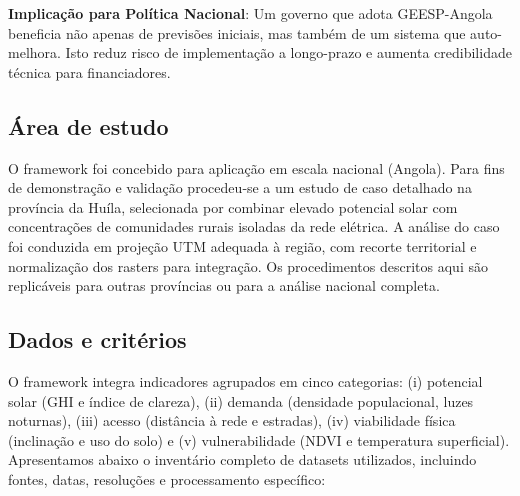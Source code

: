 \documentclass[12pt, a4paper]{article}
\begin{document}
{{{{{{{{{{{{\textbf{Implicação para Política Nacional}: Um governo que adota GEESP-Angola beneficia não apenas de previsões iniciais, mas também de um sistema que auto-melhora. Isto reduz risco de implementação a longo-prazo e aumenta credibilidade técnica para financiadores.

\subsection{Área de estudo}

O framework foi concebido para aplicação em escala nacional (Angola). Para fins de demonstração e validação procedeu‑se a um estudo de caso detalhado na província da Huíla, selecionada por combinar elevado potencial solar com concentrações de comunidades rurais isoladas da rede elétrica. A análise do caso foi conduzida em projeção UTM adequada à região, com recorte territorial e normalização dos rasters para integração. Os procedimentos descritos aqui são replicáveis para outras províncias ou para a análise nacional completa.

\subsection{Dados e critérios}

O framework integra indicadores agrupados em cinco categorias: (i) potencial solar (GHI e índice de clareza), (ii) demanda (densidade populacional, luzes noturnas), (iii) acesso (distância à rede e estradas), (iv) viabilidade física (inclinação e uso do solo) e (v) vulnerabilidade (NDVI e temperatura superficial). Apresentamos abaixo o inventário completo de datasets utilizados, incluindo fontes, datas, resoluções e processamento específico:

}}}}}}}}}}}}
\end{document}

